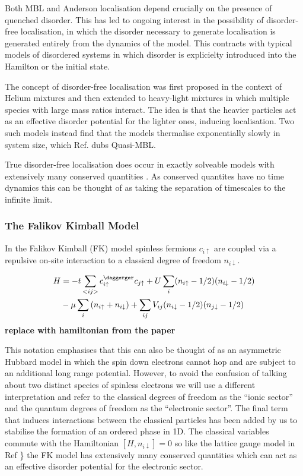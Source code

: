 Both MBL and Anderson localisation depend crucially on the presence of
quenched disorder. This has led to ongoing interest in the possibility
of disorder-free localisation, in which the disorder necessary to
generate localisation is generated entirely from the dynamics of the
model. This contracts with typical models of disordered systems in which
disorder is explicielty introduced into the Hamilton or the initial
state.

The concept of disorder-free localisation was first proposed in the
context of Helium mixtures \textcite{kagan1984localization} and then
extended to heavy-light mixtures in which multiple species with large
mass ratios interact. The idea is that the heavier particles act as an
effective disorder potential for the lighter ones, inducing
localisation. Two such models
\autocite{yao_quasi-many-body_2016,schiulaz_dynamics_2015} instead find
that the models thermalise exponentially slowly in system size, which
Ref. \textcite{yao_quasi-many-body_2016} dubs Quasi-MBL.

True disorder-free localisation does occur in exactly solveable models
with extensively many conserved quantities
\textcite{smith_disorder-free_2017}. As conserved quantites have no time
dynamics this can be thought of as taking the separation of timescales
to the infinite limit.

\hypertarget{the-falikov-kimball-model}{%
\subsubsection{The Falikov Kimball
Model}\label{the-falikov-kimball-model}}

In the Falikov Kimball (FK) model spinless fermions \(c_{i\uparrow}\)
are coupled via a repulsive on-site interaction to a classical degree of
freedom \(n_{i\downarrow}\).

\[\begin{aligned}
H &= -t \sum_{<ij>} c^\daggerger_{i\uparrow}c_{j\uparrow} + U \sum_{i} (n_{i \uparrow} - 1/2)( n_{i\downarrow} - 1/2) \\
       & - \mu \sum_i \left( n_{i \uparrow} + n_{i \downarrow} \right) + \sum_{ij} V_{ij} (n_{i\downarrow} - 1/2)(n_{j\downarrow} - 1/2) 
\end{aligned}\] \textbf{replace with hamiltonian from the paper}

This notation emphasises that this can also be thought of as an
asymmetric Hubbard model in which the spin down electrons cannot hop and
are subject to an additional long range potential. However, to avoid the
confusion of talking about two distinct species of spinless electrons we
will use a different interpretation and refer to the classical degrees
of freedom as the ``ionic sector'' and the quantum degrees of freedom as
the ``electronic sector''. The final term that induces interactions
between the classical particles has been added by us to stabilise the
formation of an ordered phase in 1D. The classical variables commute
with the Hamiltonian \([H, n_{i\downarrow}] = 0\) so like the lattice
gauge model in Ref \textcite{smith_disorder-free_2017}\} the FK model
has extensively many conserved quantities which can act as an effective
disorder potential for the electronic sector.

